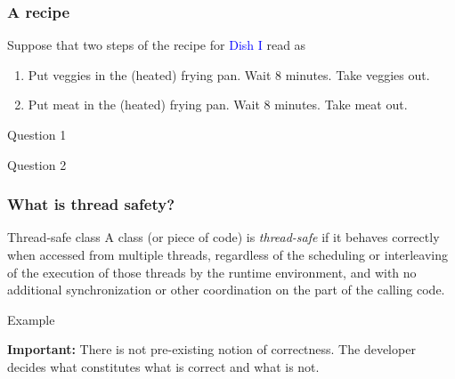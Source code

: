 \documentclass[xcolor={dvipsnames,svgnames},aspectratio=169]{beamer}
\begin{document}
\begin{frame}[fragile]
  \frametitle{A recipe}

  Suppose that two steps of the recipe for \textcolor{blue}{Dish I} read as
  \begin{enumerate}
    \item Put veggies in the (heated) frying pan. Wait 8 minutes. Take veggies
      out.
    \item Put meat in the (heated) frying pan. Wait 8 minutes. Take meat out.
    \end{enumerate}
    \vspace{0.6cm}
    \begin{block}{Question 1}
    \end{block}
    \begin{block}{Question 2}
    \end{block}
\end{frame}

\begin{frame}[fragile]
  \frametitle{What is thread safety?}

  \begin{block}{Thread-safe class}
    A class (or piece of code) is \emph{thread-safe} if it behaves correctly
    when accessed from multiple threads, regardless of the scheduling or
    interleaving of the execution of those threads by the runtime environment,
    and with no additional synchronization or other coordination on the part of
    the calling code.
  \end{block}

  \vspace{1cm}
  \begin{block}{Example}
  \end{block}
\end{frame}

\begin{frame}[fragile]
  \large{\textbf{Important:} There is not pre-existing notion of correctness.
    The developer decides what constitutes what is correct and what is not.}
\end{frame}
\end{document}
